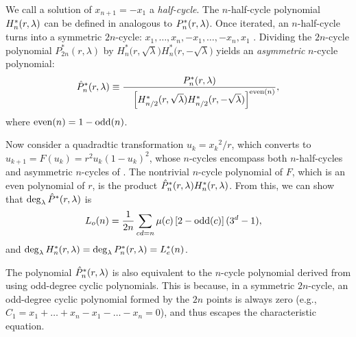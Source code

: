 \documentclass{ws-ijbc}
\begin{document}

%
%
%
%

We call a solution of $x_{n+1} = -x_1$ a \emph{half-cycle}.
The $n$-half-cycle polynomial $H^{*}_n(r, \lambda)$
  can be defined in analogous to $P^*_n(r, \lambda)$.
%
Once iterated, an $n$-half-cycle turns into a symmetric $2n$-cycle:
$x_1, \ldots, x_{n}, -x_1, \ldots, -x_{n}, x_1$ \cite{hao}.
%
Dividing the $2n$-cycle polynomial
  $P^{*}_{2n}(r, \lambda)$
  by
  $H^{*}_{n}\big(r, \sqrt \lambda\big)
   H^{*}_{n}\big(r, -\sqrt \lambda\big)$
%
yields an \emph{asymmetric} $n$-cycle polynomial:
\begin{equation}
\hat P^*_n(r, \lambda) \equiv
  \frac{
    P^*_n(r, \lambda)
  }
  { \quad
    \left[
      H^*_{n/2}(r, \sqrt\lambda)
      H^*_{n/2}(r, -\sqrt\lambda)
    \right]^{\mathrm{even}(n)}
  },
\notag
\end{equation}
%
where $\mathrm{even}(n)=1-\mathrm{odd}(n)$.


Now consider a quadradtic transformation $u_k = {x_k}^2/r$,
  which converts  to
  $u_{k+1} = F(u_k) = r^2 u_k (1 - u_k)^2$,
whose $n$-cycles encompass
  both $n$-half-cycles and asymmetric $n$-cycles of .
%
The nontrivial $n$-cycle polynomial of $F$,
  which is an even polynomial of $r$,
  is the product $\hat P^*_n(r, \lambda) H^*_n(r, \lambda)$.
%
From this, we can show that
  $\deg_\lambda \hat P^*(r, \lambda)$ is
%
\begin{align*}
  L_o(n) &= %
      \frac{1}{2n} \sum_{cd = n}
    \mu(c) \left[2 - \odd(c)\right] (3^d-1),
\end{align*}
and $\deg_\lambda H^*_n(r, \lambda) = \deg_\lambda P^*_n(r, \lambda) = L^*_e(n)$.
%


%
The polynomial $\hat P^*_n(r, \lambda)$ is also
  equivalent to the $n$-cycle polynomial
  derived from  using odd-degree cyclic polynomials.
%
This is because,
  in a symmetric $2n$-cycle,
  an odd-degree cyclic polynomial formed by the $2n$ points
  is always zero
  (e.g., $C_1 = x_1 + \dots + x_n - x_1 - \dots - x_n = 0$),
%
and thus escapes the characteristic equation.
%
%
\end{document}
